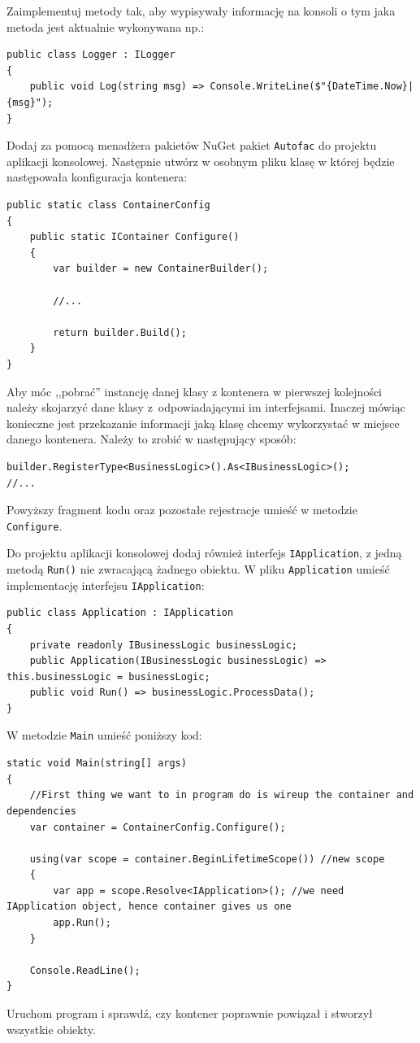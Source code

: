 Zaimplementuj metody tak, aby wypisywały informację na konsoli o tym jaka metoda jest aktualnie wykonywana np.:
\begin{lstlisting}
public class Logger : ILogger
{
	public void Log(string msg) => Console.WriteLine($"{DateTime.Now}|{msg}");
}
\end{lstlisting}

Dodaj za pomocą menadżera pakietów NuGet pakiet \texttt{Autofac} do projektu aplikacji konsolowej.
Następnie utwórz w osobnym pliku klasę w której będzie następowała konfiguracja kontenera:
\begin{lstlisting}
public static class ContainerConfig
{
	public static IContainer Configure()
	{
		var builder = new ContainerBuilder();
		
		//...
		
		return builder.Build();
	}
}
\end{lstlisting}
Aby móc ,,pobrać'' instancję danej klasy z kontenera w pierwszej kolejności należy skojarzyć dane klasy z~odpowiadającymi im interfejsami. Inaczej mówiąc konieczne jest przekazanie informacji jaką klasę chcemy wykorzystać w miejsce danego kontenera. Należy to zrobić w następujący sposób:
\begin{lstlisting}
builder.RegisterType<BusinessLogic>().As<IBusinessLogic>();
//...
\end{lstlisting}
Powyższy fragment kodu oraz pozostałe rejestracje umieść w metodzie \texttt{Configure}.

Do projektu aplikacji konsolowej dodaj również interfejs \texttt{IApplication}, z jedną metodą \texttt{Run()} nie zwracającą żadnego obiektu. W pliku \texttt{Application} umieść implementację interfejsu \texttt{IApplication}:
\begin{lstlisting}
public class Application : IApplication
{
	private readonly IBusinessLogic businessLogic;	
	public Application(IBusinessLogic businessLogic) => this.businessLogic = businessLogic;	
	public void Run() => businessLogic.ProcessData();
}
\end{lstlisting}

W metodzie \texttt{Main} umieść poniższy kod:
\begin{lstlisting}
static void Main(string[] args)
{
	//First thing we want to in program do is wireup the container and dependencies
	var container = ContainerConfig.Configure();
	
	using(var scope = container.BeginLifetimeScope()) //new scope 
	{
		var app = scope.Resolve<IApplication>(); //we need IApplication object, hence container gives us one
		app.Run();
	}
	
	Console.ReadLine();
}
\end{lstlisting}
Uruchom program i sprawdź, czy kontener poprawnie powiązał i stworzył wszystkie obiekty.

